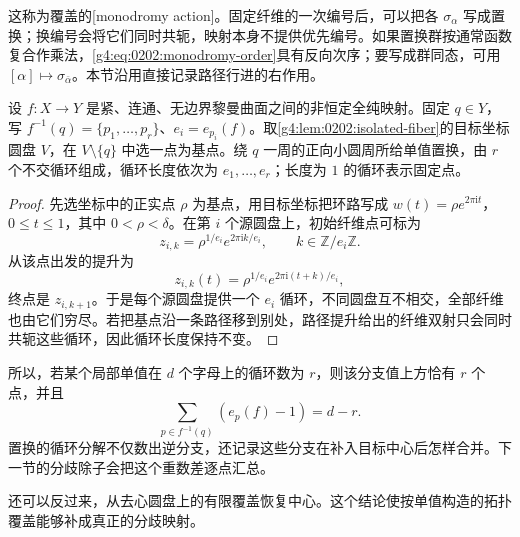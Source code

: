 这称为覆盖的[monodromy action]。固定纤维的一次编号后，可以把各 \(\sigma_\alpha\) 写成置换；换编号会将它们同时共轭，映射本身不提供优先编号。如果置换群按通常函数复合作乘法，\eqref{g4:eq:0202:monodromy-order}具有反向次序；要写成群同态，可用 \([\alpha]\mapsto\sigma_{\bar\alpha}\)。本节沿用直接记录路径行进的右作用。

\begin{proposition}\label{g4:prop:0202:local-monodromy}
	设 \(f:X\rightarrow Y\) 是紧、连通、无边界黎曼曲面之间的非恒定全纯映射。固定 \(q\in Y\)，写 \(f^{-1}(q)=\{p_1,\ldots,p_r\}\)、\(e_i=e_{p_i}(f)\)。取\cref{g4:lem:0202:isolated-fiber}的目标坐标圆盘 \(V\)，在 \(V\setminus\{q\}\) 中选一点为基点。绕 \(q\) 一周的正向小圆周所给单值置换，由 \(r\) 个不交循环组成，循环长度依次为 \(e_1,\ldots,e_r\)；长度为 \(1\) 的循环表示固定点。
\end{proposition}
\begin{proof}
	先选坐标中的正实点 \(\rho\) 为基点，用目标坐标把环路写成 \(w(t)=\rho e^{2\pi\mathrm{i}t}\)，\(0\leq t\leq1\)，其中 \(0<\rho<\delta\)。在第 \(i\) 个源圆盘上，初始纤维点可标为
	\[
		z_{i,k}=\rho^{1/e_i}e^{2\pi\mathrm{i}k/e_i},\qquad k\in\mathbb Z/e_i\mathbb Z.
	\]
	从该点出发的提升为
	\[
		z_{i,k}(t)=\rho^{1/e_i}e^{2\pi\mathrm{i}(t+k)/e_i},
	\]
	终点是 \(z_{i,k+1}\)。于是每个源圆盘提供一个 \(e_i\) 循环，不同圆盘互不相交，全部纤维也由它们穷尽。若把基点沿一条路径移到别处，路径提升给出的纤维双射只会同时共轭这些循环，因此循环长度保持不变。
\end{proof}

所以，若某个局部单值在 \(d\) 个字母上的循环数为 \(r\)，则该分支值上方恰有 \(r\) 个点，并且
\[
	\sum_{p\in f^{-1}(q)}(e_p(f)-1)=d-r.
\]
置换的循环分解不仅数出逆分支，还记录这些分支在补入目标中心后怎样合并。下一节的分歧除子会把这个重数差逐点汇总。

\ProseParagraphBreak

还可以反过来，从去心圆盘上的有限覆盖恢复中心。这个结论使按单值构造的拓扑覆盖能够补成真正的分歧映射。

